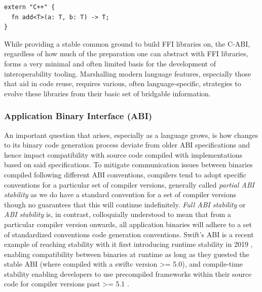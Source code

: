 \begin{listing}[ht!]
\begin{verbatim}
extern "C++" {
  fn add<T>(a: T, b: T) -> T;
}
\end{verbatim}
  \caption{Pseudocode example of extern C++ generics in Rust}
  \label{listing:extern_c_generics}
\end{listing}

While providing a stable common ground to build FFI libraries on, the C-ABI, regardless of how much of the preparation one can abstract with FFI libraries, forms a very minimal and often limited basis for the development of interoperability tooling. Marshalling modern language features, especially those that aid in code reuse, requires various, often language-specific, strategies to evolve these libraries from their basic set of bridgable information.  

\subsubsection{Application Binary Interface (ABI)}\label{s:application_binary_interface}

An important question that arises, especially as a language grows, is how changes to its binary code generation process deviate from older ABI specifications and hence impact compatibility with source code compiled with implementations based on said specifications. To mitigate communication issues between binaries compiled following different ABI conventions, compilers tend to adopt specific conventions for a particular set of compiler versions, generally called \textit{partial ABI stability} as we do have a standard convention for a set of compiler versions though no guarantees that this will continue indefinitely. \textit{Full ABI stability} or \textit{ABI stability} is, in contrast, colloquially understood to mean that from a particular compiler version onwards, all application binaries will adhere to a set of standardized conventions code generation conventions. Swift's ABI is a recent example of reaching stability with it first introducing runtime stability in 2019 \cite{rose2019abistability}, enabling compatibility between binaries at runtime as long as they guested the stable ABI (where compiled with a swiftc version >= 5.0), and compile-time stability enabling developers to use precompiled frameworks within their source code for compiler versions past >= 5.1 \cite{pestov2020library}.

